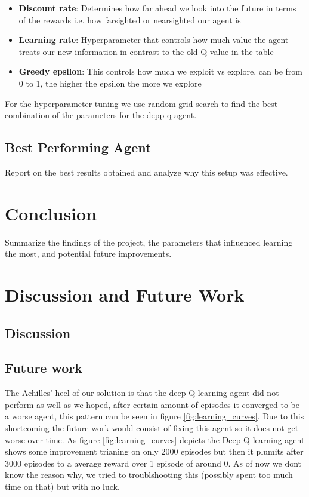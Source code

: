 \documentclass[a4paper,12pt]{article}
\begin{document}
\begin{itemize}
    \item \textbf{Discount rate}: Determines how far ahead we look into the future in terms of the rewards i.e. how farsighted or nearsighted our agent is
    \item \textbf{Learning rate}: Hyperparameter that controls how much value the agent treats our new information in contrast to the old Q-value in the table 
    \item \textbf{Greedy epsilon}: This controls how much we exploit vs explore, can be from 0 to 1, the higher the epsilon the more we explore 
\end{itemize}
For the hyperparameter tuning we use random grid search to find the best combination of the parameters for the depp-q agent.

\subsection{Best Performing Agent}
Report on the best results obtained and analyze why this setup was effective.

\section{Conclusion}
Summarize the findings of the project, the parameters that influenced learning the most, and potential future improvements.





\section{Discussion and Future Work}
\subsection{Discussion}
\subsection{Future work}
The Achilles' heel of our solution is that the deep Q-learning agent did not perform as well as we hoped, 
after certain amount of episodes it converged to be a worse agent, this pattern can be seen in figure \ref{fig:learning_curves}.
Due to this shortcoming the future work would consist of fixing this agent so it does not get worse over time. 
As figure \ref{fig:learning_curves} depicts the Deep Q-learning agent shows some improvement trianing on only 2000 episodes but then it plumits after 3000 episodes to a average reward over 1 episode of around 0. 
As of now we dont know the reason why, we tried to troublshooting this (possibly spent too much time on that) but with no luck. 
\end{document}
